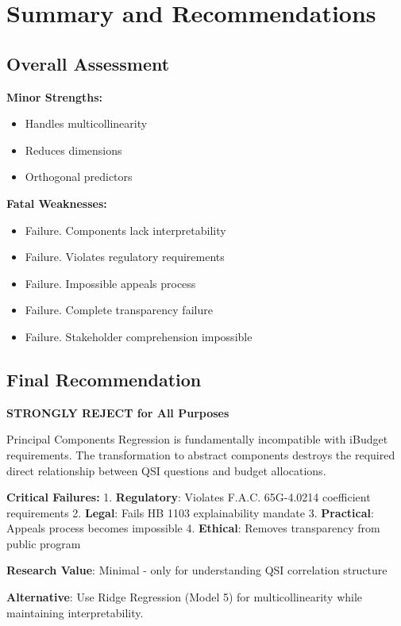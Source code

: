 \section{Summary and Recommendations}

\subsection{Overall Assessment}

\textbf{Minor Strengths:}
\begin{itemize}
    \item Handles multicollinearity
    \item Reduces dimensions
    \item Orthogonal predictors
\end{itemize}

\textbf{Fatal Weaknesses:}
\begin{itemize}
    \item Failure.  Components lack interpretability
    \item Failure.  Violates regulatory requirements
    \item Failure.  Impossible appeals process
    \item Failure.  Complete transparency failure
    \item Failure.  Stakeholder comprehension impossible
\end{itemize}

\subsection{Final Recommendation}

\textbf{STRONGLY REJECT for All Purposes}

Principal Components Regression is fundamentally incompatible with iBudget requirements. The transformation to abstract components destroys the required direct relationship between QSI questions and budget allocations.

\textbf{Critical Failures:}
1. \textbf{Regulatory}: Violates F.A.C. 65G-4.0214 coefficient requirements
2. \textbf{Legal}: Fails HB 1103 explainability mandate
3. \textbf{Practical}: Appeals process becomes impossible
4. \textbf{Ethical}: Removes transparency from public program

\textbf{Research Value}: Minimal - only for understanding QSI correlation structure

\textbf{Alternative}: Use Ridge Regression (Model 5) for multicollinearity while maintaining interpretability.
